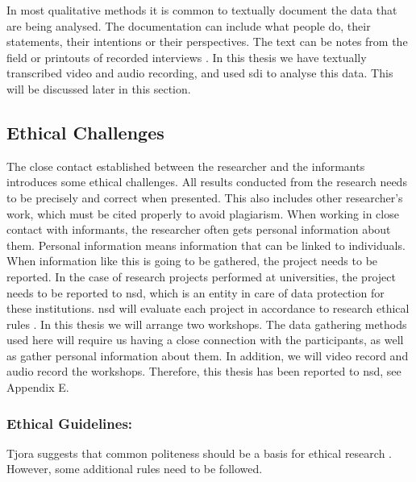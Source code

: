 In most qualitative methods it is common to textually document the data that are being analysed. The documentation can include what people do, their statements, their intentions or their perspectives. The text can be notes from the field or printouts of  recorded interviews \cite{qualitative}. In this thesis we have textually transcribed video and audio recording, and used \ac{sdi} to analyse this data. This will be discussed later in this section.

\subsection{Ethical Challenges}
\label{sec:ethicalchallenges}
The close contact established between the researcher and the informants introduces some ethical challenges. All results conducted from the research needs to be precisely and correct when presented. This also includes other researcher's work, which must be cited properly to avoid plagiarism. When working in close contact with informants, the researcher often gets personal information about them. Personal information means information that can be linked to individuals. When information like this is going to be gathered, the project needs to be reported. In the case of research projects performed at universities, the project needs to be reported to \ac{nsd}, which is an entity in care of data protection for these institutions. \ac{nsd} will evaluate each project in accordance to research ethical rules \cite{qualitative}. In this thesis we will arrange two workshops. The data gathering methods used here will require us having a close connection with the participants, as well as gather personal information about them. In addition, we will video record and audio record the workshops. Therefore, this thesis has been reported to \ac{nsd}, see Appendix E. 

\subsubsection{Ethical Guidelines:}
Tjora suggests that common politeness should be a basis for ethical research \cite{tjora}. However, some additional rules need to be followed. 

